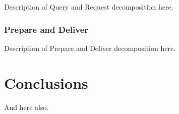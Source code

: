 \documentclass[11pt,a4paper]{article}
\begin{document}
Description of Query and Request decomposition here.

\subsubsection{Prepare and Deliver}

Description of Prepare and Deliver decomposition here.

\clearpage
\section{Conclusions}
\label{section:conclusions}

And here also.


\clearpage
{}
%
\end{document}
